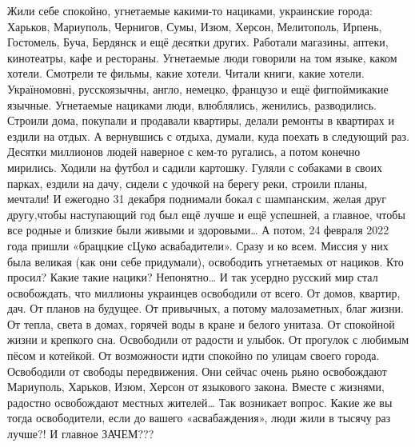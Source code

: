 Жили себе спокойно, угнетаемые какими-то нациками, украинские города:
Харьков, Мариуполь, Чернигов, Сумы, Изюм, Херсон, Мелитополь, Ирпень, Гостомель, Буча, Бердянск и ещё десятки других.
Работали магазины, аптеки, кинотеатры, кафе и рестораны.
Угнетаемые люди говорили на том языке, каком хотели.
Смотрели те фильмы, какие хотели.
Читали книги, какие хотели.
Україномовні, русскоязычны, англо, немецко, французо и ещё фигпоймикакие язычные.
Угнетаемые нациками люди, влюблялись, женились, разводились.
Строили дома, покупали и продавали квартиры, делали ремонты в квартирах и ездили на отдых.
А вернувшись с отдыха, думали, куда поехать в следующий раз.
Десятки миллионов людей наверное с кем-то ругались, а потом конечно мирились.
Ходили на футбол и садили картошку.
Гуляли с собаками в своих парках, ездили на дачу, сидели с удочкой на берегу реки, строили планы, мечтали!
И
ежегодно 31 декабря поднимали бокал с шампанским, желая друг другу,чтобы наступающий год был ещё лучше и ещё успешней, а главное, чтобы все
родные и близкие были живыми и здоровыми…
А потом, 24 февраля 2022 года пришли «браццкие сЦуко асвабадители».
Сразу и ко всем.
Миссия у них была великая (как они себе придумали), освободить угнетаемых от нациков.
Кто просил?
Какие такие нацики? Непонятно…
И так усердно русский мир стал освобождать, что миллионы украинцев освободили от всего.
От домов, квартир, дач.
От планов на будущее.
От привычных, а потому малозаметных, благ жизни.
От тепла, света в домах, горячей воды в кране и белого унитаза.
От спокойной жизни и крепкого сна.
Освободили от радости и улыбок.
От прогулок с любимым пёсом и котейкой.
От возможности идти спокойно по улицам своего города.
Освободили от свободы передвижения.
Они сейчас очень рьяно освобождают Мариуполь, Харьков, Изюм, Херсон от языкового закона.
Вместе с жизнями, радостно освобождают местных жителей…
Так возникает вопрос. Какие же вы тогда освободители, если до вашего «асвабаждения», люди жили в тысячу раз лучше?!
И главное ЗАЧЕМ???

